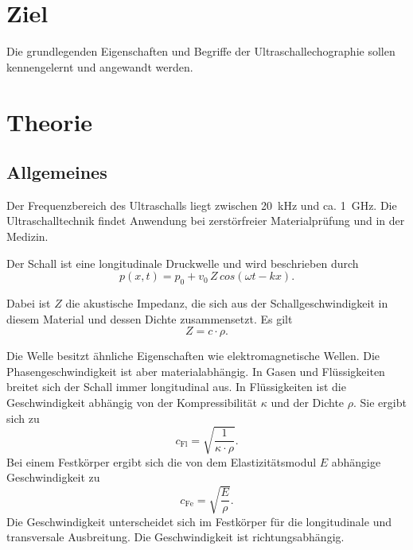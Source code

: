 \section{Ziel}

Die grundlegenden Eigenschaften und Begriffe der
Ultraschallechographie sollen kennengelernt und angewandt
werden.

\section{Theorie}
\label{sec:Theorie}
\subsection{Allgemeines} %
Der Frequenzbereich des Ultraschalls liegt zwischen 
\SI{20}{\kilo\hertz} und ca. \SI{1}{\giga\hertz}. 
Die Ultraschalltechnik findet Anwendung bei 
zerstörfreier Materialprüfung und in der Medizin. 

\noindent Der Schall ist eine longitudinale Druckwelle und wird 
beschrieben durch
\begin{equation*}
    p(x,t) = p_0 + v_0 \, Z \, cos(\omega t - kx).
\end{equation*}

\noindent Dabei ist $Z$ die akustische Impedanz, die sich aus der 
Schallgeschwindigkeit in diesem Material und dessen Dichte 
zusammensetzt. Es gilt 
\begin{equation*}
    Z = c \cdot \rho.
\end{equation*}

\noindent Die Welle besitzt ähnliche Eigenschaften wie 
elektromagnetische Wellen. Die Phasengeschwindigkeit 
ist aber materialabhängig. 
In Gasen und Flüssigkeiten breitet 
sich der Schall immer longitudinal aus. In Flüssigkeiten ist 
die Geschwindigkeit abhängig von der Kompressibilität 
$\kappa$ und der Dichte $\rho$. 
Sie ergibt sich zu 
\begin{equation*}
    c_{\text{Fl}}= \sqrt{\frac{1}{\kappa \cdot \rho}}.
\end{equation*}
Bei einem Festkörper ergibt sich die von dem Elastizitätsmodul
$E$ abhängige Geschwindigkeit zu 
\begin{equation*}
    c_{\text{Fe}}= \sqrt{\frac{E}{\rho}}.
\end{equation*}
Die Geschwindigkeit unterscheidet 
sich im Festkörper für die longitudinale und
transversale Ausbreitung. Die Geschwindigkeit ist richtungsabhängig.

